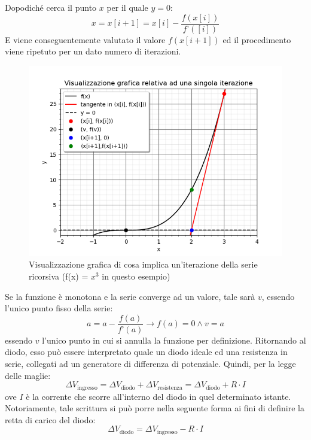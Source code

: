 \documentclass{article}[a4paper, oneside, 11pt]
\begin{document}
 Dopodiché cerca il punto $x$ per il quale $y = 0$:
\begin{equation}
x = x[i+1] = x[i] - \frac{f(x[i])}{f’([i])}
\end{equation}
E viene conseguentemente valutato il valore $f(x[i+1])$ ed il procedimento viene 
ripetuto per un dato numero di iterazioni. 
\begin{figure}[H]
	\centering 
 		\includegraphics[scale=0.75]{./Figura1_appendiceB.png}
	\caption{Visualizzazione grafica di cosa implica un’iterazione della 
serie ricorsiva (f(x) = $x^3$ in questo esempio)}
\end{figure}
Se la funzione è monotona e la serie converge ad un valore, tale sarà $v$, 
essendo l’unico punto fisso della serie:
\begin{equation}
 {a = a -  {\frac{f(a)}{f{’}(a)}}}\to{{f(a) = 0}\land{v = a}}
\end{equation}
essendo $v$ l’unico punto in cui si annulla la funzione per definizione.
Ritornando al diodo, esso può essere interpretato quale un diodo ideale ed una 
resistenza in serie, collegati ad un generatore di differenza di potenziale. 
Quindi, per la legge delle maglie:
\begin{equation}
\Delta V_{\text{ingresso}} = \Delta V_{\text{diodo}} + \Delta 
V_{\text{resistenza}} = \Delta V_{\text{diodo}} + R \cdot I
\end{equation}
ove $I$ è la corrente che scorre all’interno del diodo in quel determinato 
istante. Notoriamente, tale scrittura si può porre nella seguente forma ai 
fini di definire la retta di carico del diodo:
\begin{equation}
\Delta V_{\text{diodo}} = \Delta V_{\text{ingresso}} - R \cdot I
\end{equation}
\end{document}
